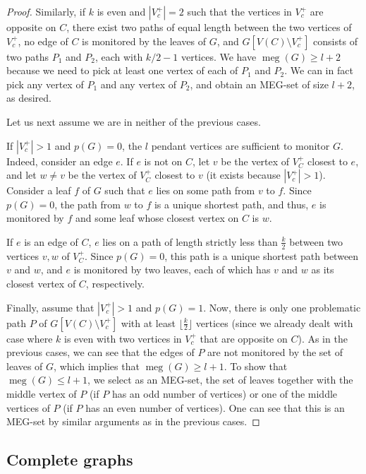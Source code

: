 \documentclass[10pt,a4paper]{article}
\DeclareMathOperator{\MEG}{meg}
\begin{document}
\begin{proof}
Similarly, if $k$ is even and $|V_c^{+}|=2$ such that the vertices in $V_c^{+}$ are opposite on $C$, there exist two paths of equal length between the two vertices of $V_c^{+}$, no edge of $C$ is monitored by the leaves of $G$, and $G[V(C)\setminus V_{c}^{+}]$ consists of two paths $P_1$ and $P_2$, each with $k/2-1$ vertices. We have $\MEG(G)\geq l+2$ because we need to pick at least one vertex of each of $P_1$ and $P_2$. We can in fact pick any vertex of $P_1$ and any vertex of $P_2$, and obtain an MEG-set of size $l+2$, as desired.

Let us next assume we are in neither of the previous cases.

If $|V_c^{+}|> 1$ and $p(G)=0$, the $l$ pendant vertices are sufficient to monitor $G$. Indeed, consider an edge $e$. If $e$ is not on $C$, let $v$ be the vertex of $V_C^+$ closest to $e$, and let $w\neq v$ be the vertex of $V_C^+$ closest to $v$ (it exists because $|V_c^{+}|>1$). Consider a leaf $f$ of $G$ such that $e$ lies on some path from $v$ to $f$. Since $p(G)=0$, the path from $w$ to $f$ is a unique shortest path, and thus, $e$ is monitored by $f$ and some leaf whose closest vertex on $C$ is $w$.

If $e$ is an edge of $C$, $e$ lies on a path of length strictly less than $\frac{k}{2}$ between two vertices $v,w$ of $V_C^+$. Since $p(G)=0$, this path is a unique shortest path between $v$ and $w$, and $e$ is monitored by two leaves, each of which has $v$ and $w$ as its closest vertex of $C$, respectively.



Finally, assume that $|V_c^{+}|>1$ and $p(G)=1$. Now, there is only one problematic path $P$ of $G[V(C)\setminus V_{c}^{+}]$ with at least $\lfloor\frac{k}{2}\rfloor$ vertices (since we already dealt with case where $k$ is even with two vertices in $V_c^{+}$ that are opposite on $C$). As in the previous cases, we can see that the edges of $P$ are not monitored by the set of leaves of $G$, which implies that $\MEG(G)\geq l+1$. To show that $\MEG(G)\leq l+1$, we select as an MEG-set, the set of leaves together with the middle vertex of $P$ (if $P$ has an odd number of vertices) or one of the middle vertices of $P$ (if $P$ has an even number of vertices). One can see that this is an MEG-set by similar arguments as in the previous cases.
\end{proof}


\subsection{Complete graphs}
\end{document}
